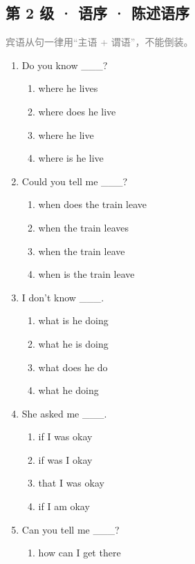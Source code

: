 \documentclass[11pt,a4paper]{ctexart}
\begin{document}
\subsection*{第 2 级 · 语序 · 陈述语序}
\noindent\textcolor{gray}{宾语从句一律用“主语 + 谓语”，不能倒装。}\par\smallskip
\begin{enumerate}[leftmargin=*,itemsep=4pt]
\item Do you know \_\_\_?
\begin{enumerate}[label=\Alph*.,leftmargin=2em,itemsep=1pt,topsep=2pt]
\item where he lives
\item where does he live
\item where he live
\item where is he live
\end{enumerate}
\item Could you tell me \_\_\_?
\begin{enumerate}[label=\Alph*.,leftmargin=2em,itemsep=1pt,topsep=2pt]
\item when does the train leave
\item when the train leaves
\item when the train leave
\item when is the train leave
\end{enumerate}
\item I don't know \_\_\_.
\begin{enumerate}[label=\Alph*.,leftmargin=2em,itemsep=1pt,topsep=2pt]
\item what is he doing
\item what he is doing
\item what does he do
\item what he doing
\end{enumerate}
\item She asked me \_\_\_.
\begin{enumerate}[label=\Alph*.,leftmargin=2em,itemsep=1pt,topsep=2pt]
\item if I was okay
\item if was I okay
\item that I was okay
\item if I am okay
\end{enumerate}
\item Can you tell me \_\_\_?
\begin{enumerate}[label=\Alph*.,leftmargin=2em,itemsep=1pt,topsep=2pt]
\item how can I get there

\end{enumerate}
\end{enumerate}
\end{document}
